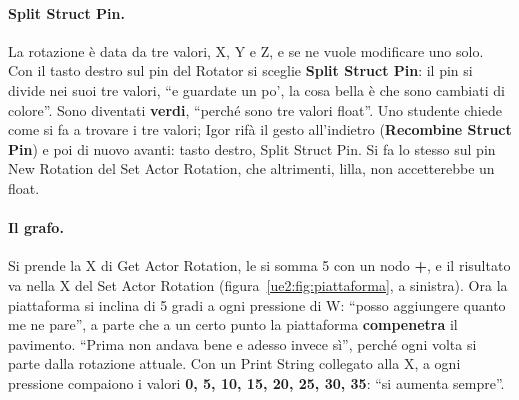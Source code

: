 \paragraph{Split Struct Pin.} La rotazione è data da tre valori, X, Y e Z, e se ne vuole
modificare uno solo. Con il tasto destro sul pin del Rotator si sceglie \textbf{Split
Struct Pin}: il pin si divide nei suoi tre valori, ``e guardate un po', la cosa bella è
che sono cambiati di colore''. Sono diventati \textbf{verdi}, ``perché sono tre valori
float''. Uno studente chiede come si fa a trovare i tre valori; Igor rifà il gesto
all'indietro (\textbf{Recombine Struct Pin}) e poi di nuovo avanti: tasto destro, Split
Struct Pin. Si fa lo stesso sul pin New Rotation del Set Actor Rotation, che altrimenti,
lilla, non accetterebbe un float.

\paragraph{Il grafo.} Si prende la X di Get Actor Rotation, le si somma 5 con un nodo
\textbf{+}, e il risultato va nella X del Set Actor Rotation
(figura~\ref{ue2:fig:piattaforma}, a sinistra). Ora la piattaforma si inclina di 5 gradi
a ogni pressione di W: ``posso aggiungere quanto me ne pare'', a parte che a un certo
punto la piattaforma \textbf{compenetra} il pavimento. ``Prima non andava bene e adesso
invece sì'', perché ogni volta si parte dalla rotazione attuale. Con un Print String
collegato alla X, a ogni pressione compaiono i valori \textbf{0, 5, 10, 15, 20, 25, 30,
35}: ``si aumenta sempre''.

